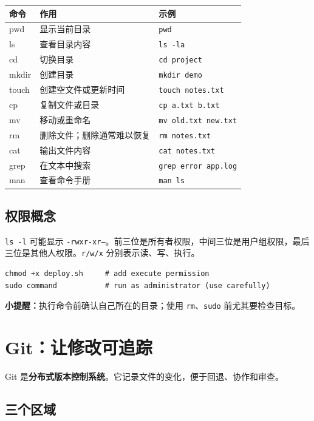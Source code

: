 \documentclass[11pt,a4paper]{ctexart}
\newcommand{\key}[1]{\textcolor{accent}{\textbf{#1}}}
\begin{document}
\begin{tabularx}{\textwidth}{>{\ttfamily}l X l}
\toprule
\normalfont 命令 & 作用 & 示例 \\
\midrule
pwd & 显示当前目录 & \texttt{pwd} \\
ls & 查看目录内容 & \texttt{ls -la} \\
cd & 切换目录 & \texttt{cd project} \\
mkdir & 创建目录 & \texttt{mkdir demo} \\
touch & 创建空文件或更新时间 & \texttt{touch notes.txt} \\
cp & 复制文件或目录 & \texttt{cp a.txt b.txt} \\
mv & 移动或重命名 & \texttt{mv old.txt new.txt} \\
rm & 删除文件；删除通常难以恢复 & \texttt{rm notes.txt} \\
cat & 输出文件内容 & \texttt{cat notes.txt} \\
grep & 在文本中搜索 & \texttt{grep error app.log} \\
man & 查看命令手册 & \texttt{man ls} \\
\bottomrule
\end{tabularx}

\subsection{权限概念}

\texttt{ls -l} 可能显示 \texttt{-rwxr-xr--}。前三位是所有者权限，中间三位是用户组权限，最后三位是其他人权限。\texttt{r/w/x} 分别表示读、写、执行。

\begin{lstlisting}
chmod +x deploy.sh     # add execute permission
sudo command           # run as administrator (use carefully)
\end{lstlisting}

\textbf{小提醒：}执行命令前确认自己所在的目录；使用 \texttt{rm}、\texttt{sudo} 前尤其要检查目标。

\section{Git：让修改可追踪}

Git 是\key{分布式版本控制系统}。它记录文件的变化，便于回退、协作和审查。

\subsection{三个区域}
\end{document}
